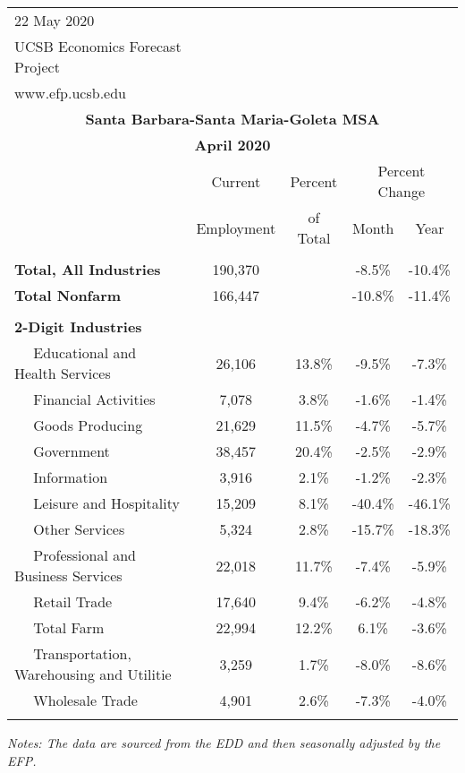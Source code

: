 \documentclass[12pt]{article}
\begin{document}
\begin{landscape}
\begin{table}
\begin{tabular}{|l|c|c|c|c|}
\multicolumn{1}{l}{\small 22 May 2020} & \multicolumn{4}{c}{} \\
\multicolumn{1}{l}{\small UCSB Economics Forecast Project} & \multicolumn{4}{c}{} \\
\multicolumn{1}{l}{\small www.efp.ucsb.edu} & \multicolumn{4}{c}{} \\
\multicolumn{5}{c}{\large \textbf{Santa Barbara-Santa Maria-Goleta MSA}} \\
\multicolumn{5}{c}{\large \textbf{April 2020}} \
\multicolumn{5}{l}{\small Data Seasonally Adjusted} \\ \hline \hline
& Current & Percent & \multicolumn{2}{c}{Percent Change} \vline \\
& Employment & of Total & Month & Year \\ \hline
&&&& \\
\textbf{Total, All Industries} & 190,370 && -8.5\% & -10.4\% \\
\textbf{Total Nonfarm} & 166,447 && -10.8\% & -11.4\% \\
&&&& \\
\textbf{2-Digit Industries} &&&& \\
$\quad$ Educational and Health Services & 26,106 & 13.8\% & -9.5\% & -7.3\% \\
$\quad$ Financial Activities & 7,078 & 3.8\% & -1.6\% & -1.4\% \\
$\quad$ Goods Producing & 21,629 & 11.5\% & -4.7\% & -5.7\% \\
$\quad$ Government & 38,457 & 20.4\% & -2.5\% & -2.9\% \\
$\quad$ Information & 3,916 & 2.1\% & -1.2\% & -2.3\% \\
$\quad$ Leisure and Hospitality & 15,209 & 8.1\% & -40.4\% & -46.1\% \\
$\quad$ Other Services & 5,324 & 2.8\% & -15.7\% & -18.3\% \\
$\quad$ Professional and Business Services & 22,018 & 11.7\% & -7.4\% & -5.9\% \\
$\quad$ Retail Trade & 17,640 & 9.4\% & -6.2\% & -4.8\% \\
$\quad$ Total Farm & 22,994 & 12.2\% & 6.1\% & -3.6\% \\
$\quad$ Transportation, Warehousing and Utilitie & 3,259 & 1.7\% & -8.0\% & -8.6\% \\
$\quad$ Wholesale Trade & 4,901 & 2.6\% & -7.3\% & -4.0\% \\
&&&& \\ \hline \hline
\end{tabular}
\par
\vspace{.5em}
\footnotesize
\textit{Notes: The data are sourced from the EDD and then seasonally adjusted by the EFP.}
\end{table}
\end{landscape}
\end{document}
